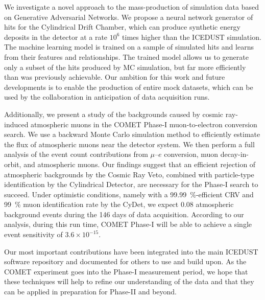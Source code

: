 We investigate a novel approach to the mass-production of simulation data based
on Generative Adversarial Networks. We propose a neural network generator of
hits for the Cylindrical Drift Chamber, which can produce synthetic energy
deposits in the detector at a rate $10^6$ times higher than the ICEDUST
simulation. The machine learning model is trained on a sample of simulated hits
and learns from their features and relationships. The trained model allows us to
generate only a subset of the hits produced by MC simulation, but far more
efficiently than was previously achievable. Our ambition for this work and
future developments is to enable the production of entire mock datasets, which
can be used by the collaboration in anticipation of data acquisition runs.

Additionally, we present a study of the backgrounds caused by cosmic ray-induced
atmospheric muons in the COMET Phase\nobreakdash-I muon-to-electron conversion search. We
use a backward Monte Carlo simulation method to efficiently estimate the flux of
atmospheric muons near the detector system. We then perform a full analysis of
the event count contributions from $\mu$--$e$ conversion, muon decay-in-orbit,
and atmospheric muons. Our findings suggest that an efficient rejection of
atmospheric backgrounds by the Cosmic Ray Veto, combined with particle-type
identification by the Cylindrical Detector, are necessary for the Phase\nobreakdash-I search
to succeed. Under optimistic conditions, namely with a
\SI{99.99}{\percent}-efficient CRV and \SI{99}{\percent} muon identification
rate by the CyDet, we expect 0.08 atmospheric background events during the 146
days of data acquisition. According to our analysis, during this run time, COMET
Phase\nobreakdash-I will be able to achieve a single event sensitivity of $3.6 \times
10^{-15}$.


Our most important contributions have been integrated into the main ICEDUST
software repository and documented for others to use and build upon. As the
COMET experiment goes into the Phase\nobreakdash-I measurement period, we hope that these
techniques will help to refine our understanding of the data and that they can
be applied in preparation for Phase\nobreakdash-II and beyond.